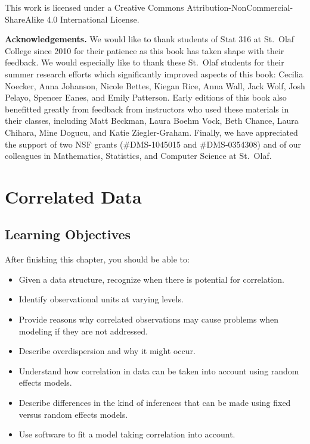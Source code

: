 \documentclass[
]{krantz}
\providecommand{\tightlist}{%
  \setlength{\itemsep}{0pt}\setlength{\parskip}{0pt}}
\begin{document}
This work is licensed under a Creative Commons Attribution-NonCommercial-ShareAlike 4.0 International License.

\textbf{Acknowledgements.} We would like to thank students of Stat 316 at St.~Olaf College since 2010 for their patience as this book has taken shape with their feedback. We would especially like to thank these St.~Olaf students for their summer research efforts which significantly improved aspects of this book: Cecilia Noecker, Anna Johanson, Nicole Bettes, Kiegan Rice, Anna Wall, Jack Wolf, Josh Pelayo, Spencer Eanes, and Emily Patterson. Early editions of this book also benefitted greatly from feedback from instructors who used these materials in their classes, including Matt Beckman, Laura Boehm Vock, Beth Chance, Laura Chihara, Mine Dogucu, and Katie Ziegler-Graham. Finally, we have appreciated the support of two NSF grants (\#DMS-1045015 and \#DMS-0354308) and of our colleagues in Mathematics, Statistics, and Computer Science at St.~Olaf.

\hypertarget{ch-corrdata}{%
\chapter{Correlated Data}\label{ch-corrdata}}

\hypertarget{learning-objectives}{%
\section{Learning Objectives}\label{learning-objectives}}

After finishing this chapter, you should be able to:

\begin{itemize}
\tightlist
\item
  Given a data structure, recognize when there is potential for correlation.
\item
  Identify observational units at varying levels.
\item
  Provide reasons why correlated observations may cause problems when modeling if they are not addressed.
\item
  Describe overdispersion and why it might occur.
\item
  Understand how correlation in data can be taken into account using random effects models.
\item
  Describe differences in the kind of inferences that can be made using fixed versus random effects models.
\item
  Use software to fit a model taking correlation into account.
\end{itemize}
\end{document}
